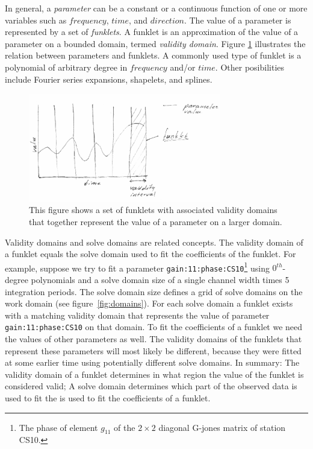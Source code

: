 \documentclass[10pt]{lofar}
\begin{document}
In general, a \emph{parameter} can be a constant or a continuous function of one
or more variables such as $frequency$, $time$, and $direction$. The value of a
parameter is represented by a set of \emph{funklets}. A funklet is an
approximation of the value of a parameter on a bounded domain, termed
\emph{validity domain}. Figure \ref{fig:funklet} illustrates the relation
between parameters and funklets. A commonly used type of funklet is a polynomial
of arbitrary degree in $frequency$ and/or $time$. Other posibilities include
Fourier series expansions, shapelets, and splines.

\begin{figure}[htbp]
\centering
\includegraphics[width=0.75\textwidth]{images/funklet.eps}
\caption{This figure shows a set of funklets with associated validity domains
that together represent the value of a parameter on a larger domain.}
\label{fig:funklet}
\end{figure}

Validity domains and solve domains are related concepts. The validity domain of
a funklet equals the solve domain used to fit the coefficients of the funklet.
For example, suppose we try to fit a parameter
\texttt{gain:11:phase:CS10}\footnote{The phase of element $g_{11}$ of the $2
\times 2$ diagonal G-jones matrix of station CS10.} using $0^{th}$-degree
polynomials and a solve domain size of a single channel width times 5
integration periods. The solve domain size defines a grid of solve domains on
the work domain (see figure~\ref{fig:domains}). For each solve domain a funklet
exists with a matching validity domain that represents the value of parameter
\texttt{gain:11:phase:CS10} on that domain. To fit the coefficients of a funklet
we need the values of other parameters as well. The validity domains of the
funklets that represent these parameters will most likely be different, because
they were fitted at some earlier time using potentially different solve domains.
In summary: The validity domain of a funklet determines in what region the value
of the funklet is considered valid; A solve domain determines which part of the
observed data is used to fit the is used to fit the coefficients of a funklet.
\end{document}
